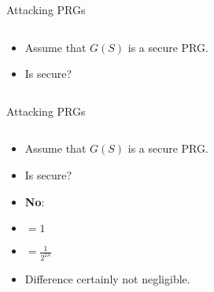 \documentclass[aspectratio=169, lualatex, handout]{beamer}
\begin{document}
\begin{frame}{Attacking PRGs}
	\begin{columns}[c]
		\begin{column}{0.5\textwidth}
			\begin{itemize}
				\item Assume that $G(S)$ is a secure PRG.
				\item Is  secure?
			\end{itemize}
		\end{column}
		\begin{column}{0.5\textwidth}
		\end{column}
	\end{columns}
\end{frame}

\begin{frame}{Attacking PRGs}
	\begin{columns}[c]
		\begin{column}{0.45\textwidth}
			\begin{itemize}
				\item<1-2> Assume that $G(S)$ is a secure PRG.
				\item<1-2> Is  secure?
				\item<1-2> \textbf{No}:
				\item<1-2>  $ = 1$
				\item<2-2>  $ = \frac{1}{2^{2\lambda}}$
				\item<2-2> Difference certainly not negligible.
			\end{itemize}
		\end{column}
		\begin{column}{0.55\textwidth}
			\begin{flushright}
			\end{flushright}
		\end{column}
	\end{columns}
\end{frame}
\end{document}
